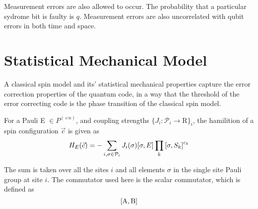 Measurement errors are also allowed to occur. The probability that a particular sydrome bit is faulty is \(q\). Measurement errors are also uncorrelated with qubit errors in both time and space.




\section{Statistical Mechanical Model}\label{sec:sec1-name}

A classical spin model and its' statistical mechanical properties capture the error correction properties of the quantum code, in a way that the threshold of the error correcting code is the phase transition of the classical spin model.\cite{chubbflammia2021, dlkp2002}

\begin{definition}
    For a Pauli E \(\in P^(\times n)\), and coupling strengths \( \{ J_i: \mathcal{P}_i \rightarrow \mathrm{R} \}_i \), the hamilition of a spin configuration \( \vec{c}\) is given as 
    \[
        H_E(\vec{c}) = - \sum_{i, \sigma \in  \mathcal{P}_i} J_i(\sigma) \comm{\sigma}{E} \prod_{k} \comm{\sigma}{S_k}^{c_k}
    \]
\end{definition}
The sum is taken over all the sites \(i\) and all elements \( \sigma \) in the single site Pauli group at site \(i\). The commutator used here is the scalar commutator, which is defined as 
\begin{equation}
    \mathrm{\comm{A}{B}}
\end{equation}

